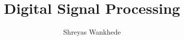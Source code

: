 \documentclass[journal,12pt,twocolumn]{IEEEtran}
\numberwithin{equation}{section}
\begin{document}
     \def\rightbox#1{\makebox[0in][r]{#1}}
     \def\centbox#1{\makebox[0in]{#1}}
     \def\topbox#1{\raisebox{-\baselineskip}[0in][0in]{#1}}
     \def\midbox#1{\raisebox{-0.5\baselineskip}[0in][0in]{#1}}
\vspace{3cm}
\title{ 
Digital Signal Processing
}
%
%
%
\author{ Shreyas Wankhede

}
% 
%
% 
\end{document}
